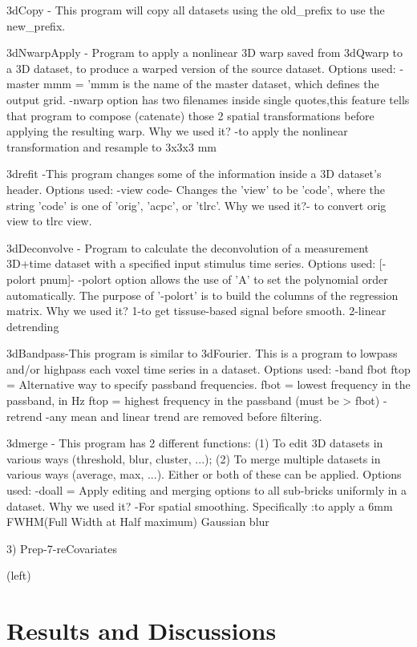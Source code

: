 \documentclass{article}
\begin{document}
3dCopy - This program will copy all datasets using the old\_prefix to
use the new\_prefix.

3dNwarpApply - Program to apply a nonlinear 3D warp saved from 3dQwarp
to a 3D dataset, to produce a warped version of the source dataset.
Options used: -master mmm = 'mmm is the name of the master dataset,
which defines the output grid. -nwarp option has two filenames inside
single quotes,this feature tells that program to compose (catenate)
those 2 spatial transformations before applying the resulting warp.
Why we used it? -to apply the nonlinear transformation and resample to
3x3x3 mm

3drefit -This program changes some of the information inside a 3D
dataset's header. Options used: -view code- Changes the 'view' to be
'code', where the string 'code' is one of 'orig', 'acpc', or 'tlrc'.
Why we used it?- to convert orig view to tlrc view.

3dDeconvolve - Program to calculate the deconvolution of a measurement
3D+time dataset with a specified input stimulus time series. Options
used: [-polort pnum]- -polort option allows the use of 'A' to set the
polynomial order automatically.   The purpose of '-polort' is to
build the columns of the regression matrix. Why we used it? 1-to get
tissuse-based signal before smooth. 2-linear detrending

3dBandpass-This program is similar to 3dFourier. This is a program to
lowpass and/or highpass each voxel time series in a dataset. Options
used: -band fbot ftop = Alternative way to specify passband
frequencies. fbot = lowest frequency in the passband, in Hz ftop =
highest frequency in the passband (must be > fbot) -retrend -any mean
and linear trend are removed before filtering.

3dmerge - This program has 2 different functions: (1) To edit 3D
datasets in various ways (threshold, blur, cluster, ...); (2) To merge
multiple datasets in various ways (average, max, ...). Either or both
of these can be applied. Options used: -doall = Apply editing and
merging options to all sub-bricks uniformly in a dataset. Why we used
it? -For spatial smoothing. Specifically :to apply a 6mm FWHM(Full
Width at Half maximum) Gaussian blur

3) Prep-7-reCovariates


(left)


\section{Results and Discussions}
\end{document}

